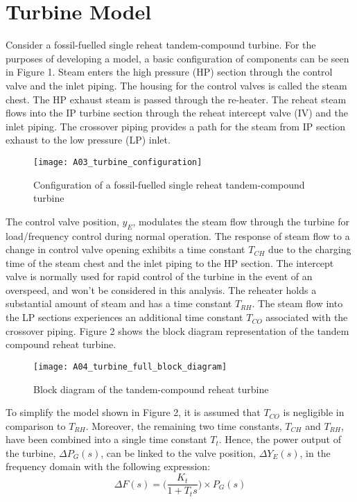 \section{Turbine Model}
Consider a fossil-fuelled single reheat tandem-compound turbine. For the purposes of developing a model, a basic configuration of components can be seen in Figure 1. Steam enters the high pressure (HP) section through the control valve and the inlet piping. The housing for the control valves is called the steam chest. The HP exhaust steam is passed through the re-heater. The reheat steam flows into the IP turbine section through the reheat intercept valve (IV) and the inlet piping. The crossover piping provides a path for the steam from IP section exhaust to the low pressure (LP) inlet.

\begin{figure}
	\centering
	\texttt{[image: A03\_turbine\_configuration]}
	\caption[Reheat tandem-compound turbine configuration]{Configuration of a fossil-fuelled single reheat tandem-compound turbine}
	\label{fig:A03_turbine_configuration}
\end{figure}

The control valve position, $y_E$, modulates the steam flow through the turbine for load/frequency control during normal operation. The response of steam flow to a change in control valve opening exhibits a time constant $T_{CH}$ due to the charging time of the steam chest and the inlet piping to the HP section. The intercept valve is normally used for rapid control of the turbine in the event of an overspeed, and won't be considered in this analysis. The reheater holds a substantial amount of steam and has a time constant $T_{RH}$. The steam flow into the LP sections experiences an additional time constant $T_{CO}$ associated with the crossover piping. Figure 2 shows the block diagram representation of the tandem compound reheat turbine.

\begin{figure}
	\centering
	\texttt{[image: A04\_turbine\_full\_block\_diagram]}
	\caption[Tandem-compound reheat turbine model]{Block diagram of the tandem-compound reheat turbine}
	\label{fig:A04_turbine_full_block_diagram}
\end{figure}

To simplify the model shown in Figure 2, it is assumed that $T_{CO}$ is negligible in comparison to $T_{RH}$. Moreover, the remaining two time constants, $T_{CH}$ and $T_{RH}$, have been combined into a single time constant $T_t$. Hence, the power output of the turbine, $\Delta P_G(s)$, can be linked to the valve position, $\Delta Y_E(s)$, in the frequency domain with the following expression:
\begin{equation}
	\Delta F(s) = \bigg( \frac{K_t}{1 + T_t s} \bigg) \times P_G(s) \label{eq:A10}
\end{equation}

